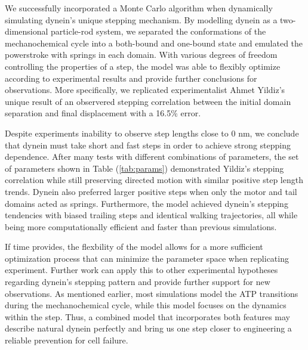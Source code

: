 

We successfully incorporated a Monte Carlo algorithm when dynamically simulating dynein's unique stepping mechanism. By modelling dynein as a two-dimensional particle-rod system, we separated the conformations of the mechanochemical cycle into a both-bound and one-bound state and emulated the powerstroke with springs in each domain. With various degrees of freedom controlling the properties of a step, the model was able to flexibly optimize according to experimental results and provide further conclusions for observations. More specifically, we replicated experimentalist Ahmet Yildiz's unique result of an observered stepping correlation between the initial domain separation and final displacement with a 16.5\% error.

Despite experiments inability to observe step lengths close to 0 nm, we conclude that dynein must take short and fast steps in order to achieve strong stepping dependence. After many tests with different combinations of parameters, the set of parameters shown in Table (\ref{tab:params}) demonstrated Yildiz's stepping correlation while still preserving directed motion with similar positive step length trends. Dynein also preferred larger positive steps when only the motor and tail domains acted as springs. Furthermore, the model achieved dynein's stepping tendencies with biased trailing steps and identical walking trajectories, all while being more computationally efficient and faster than previous simulations. 

If time provides, the flexbility of the model allows for a more sufficient optimization process that can minimize the parameter space when replicating experiment. Further work can apply this to other experimental hypotheses regarding dynein's stepping pattern and provide further support for new observations. As mentioned earlier, most simulations model the ATP transitions during the mechanochemical cycle, while this model focuses on the dynamics within the step. Thus, a combined model that incorporates both features may describe natural dynein perfectly and bring us one step closer to engineering a reliable prevention for cell failure. 

